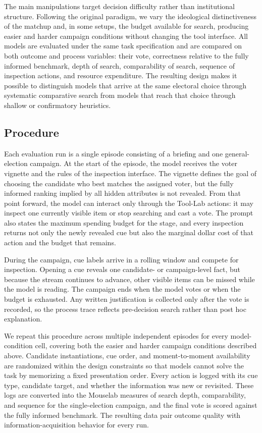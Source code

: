 The main manipulations target decision difficulty rather than institutional structure.
Following the original paradigm, we vary the ideological distinctiveness of the matchup
and, in some setups, the budget available for search, producing easier and harder
campaign conditions without changing the tool interface. All models are evaluated under
the same task specification and are compared on both outcome and process variables:
their vote, correctness relative to the fully informed benchmark, depth of search,
comparability of search, sequence of inspection actions, and resource expenditure. The
resulting design makes it possible to distinguish models that arrive at the same
electoral choice through systematic comparative search from models that reach that choice
through shallow or confirmatory heuristics.

\subsection{Procedure}

Each evaluation run is a single episode consisting of a briefing and one
general-election campaign. At the start of the episode, the model receives the
voter vignette and the rules of the inspection interface. The vignette defines
the goal of choosing the candidate
who best matches the assigned voter, but the fully informed ranking implied by
all hidden attributes is not revealed. From that point forward, the model can
interact only through the Tool-Lab actions: it may inspect one currently
visible item or stop searching and cast a vote. The prompt also states the
maximum spending budget for the stage, and every inspection returns not only
the newly revealed cue but also the marginal dollar cost of that action and the
budget that remains.

During the campaign, cue labels arrive in a rolling window and compete for
inspection. Opening a cue reveals one candidate- or campaign-level fact, but
because the stream continues to advance, other visible items can be missed
while the model is reading. The campaign ends when the model votes or when the
budget is exhausted. Any written justification is collected only after the vote
is recorded, so the process trace reflects pre-decision search rather than post
hoc explanation.

We repeat this procedure across multiple independent episodes for every
model-condition cell, covering both the easier and harder campaign conditions
described above. Candidate instantiations, cue order, and moment-to-moment
availability are randomized within the design constraints so that models cannot
solve the task by memorizing a fixed presentation order. Every action is logged
with its cue type, candidate target, and whether the information was new or
revisited. These logs are converted into the Mouselab measures of search depth,
comparability, and sequence for the single-election campaign, and the final vote
is scored against the fully informed benchmark. The resulting data pair outcome
quality with information-acquisition behavior for every run.


